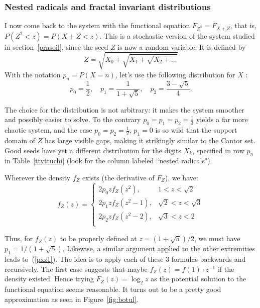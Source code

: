 \documentclass[oneside,10pt]{book}
\begin{document}


\subsubsection{Nested radicals and fractal invariant distributions}

I now come back to the system with the functional equation  $F_{Z^2} = F_{X+Z}$, that is,
 $P(Z^2<z) = P(X+Z<z)$. This is a stochastic version of the system studied in section~\ref{prasoil}, since the seed $Z$ is now a
 random variable. It is defined by
$$Z=\sqrt{X_0+\sqrt{X_1+\sqrt{X_2+\dots}}}$$
With the notation $p_n=P(X=n)$, let's use the following distribution for $X$ :
\begin{equation}
p_0 = \frac{1}{2}, \quad p_1 = \frac{1}{1 + \sqrt{5}}, \quad p_2 = \frac{3 - \sqrt{5}}{4}. \label{pxz1}
\end{equation}

The choice for the distribution is not arbitrary: it makes the system smoother and possibly easier to solve. To the contrary
$p_0 = p_1= p_2 = \frac{1}{3}$ yields a far more chaotic system, and the
case $p_0 = p_2 = \frac{1}{2}$, $p_1=0$ is so wild that the support domain of $Z$ has large visible gaps, making it strikingly
similar to the \textcolor{index}{Cantor set}.  Good seeds have yet a different distribution for the digits
 $X_k$, specified in row $p_n$ in Table~\ref{ttyttuchi} (look for the column labeled ``nested radicals").

Wherever the density $f_Z$ exists (the derivative of $F_Z$), we have:
\begin{equation}
f_Z(z)=
\begin{cases}
 2p_0 z f_Z(z^2), & 1<z<\sqrt{2}      \nonumber    \\[2pt]
 2p_1 z f_Z(z^2 -1), & \sqrt{2}<z<\sqrt{3}   \nonumber \\[2pt]
 2p_2 z f_Z(z^2 -2), & \sqrt{3}<z<2    \nonumber \\
\end{cases}
\end{equation}

Thus, for $f_Z(z)$ to be properly defined at $z = (1+\sqrt{5})/2$, we must have $p_1=1/(1+\sqrt{5})$. Likewise,
 a similar argument applied to the other extremities leads to~(\ref{pxz1}). The idea is to apply each of these 3 formulas
 backwards and recursively. The first case suggests that maybe $f_Z(z)=f(1)\cdot z^{-1}$ if the density existed. Hence trying
 $F_Z(z)=\log_2 z$ as the potential solution to the functional equation seems reasonable.  It
turns out to be a pretty good approximation as seen in Figure~\ref{fig:botul}.
\end{document}
